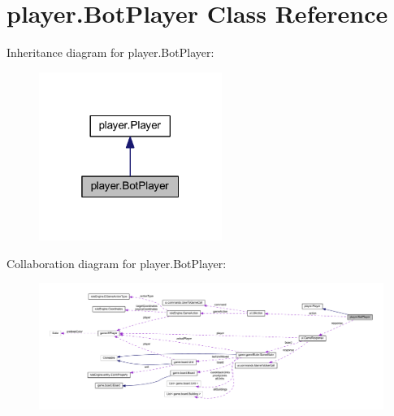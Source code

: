 \hypertarget{classplayer_1_1_bot_player}{}\section{player.\+Bot\+Player Class Reference}
\label{classplayer_1_1_bot_player}


Inheritance diagram for player.\+Bot\+Player\+:
\nopagebreak
\begin{figure}[H]
\begin{center}
\leavevmode
\includegraphics[width=169pt]{classplayer_1_1_bot_player__inherit__graph}
\end{center}
\end{figure}


Collaboration diagram for player.\+Bot\+Player\+:
\nopagebreak
\begin{figure}[H]
\begin{center}
\leavevmode
\includegraphics[width=350pt]{classplayer_1_1_bot_player__coll__graph}
\end{center}
\end{figure}
